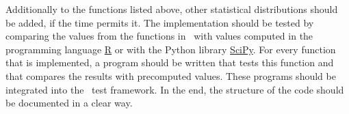 		Additionally to the functions listed above, other statistical distributions should be added, if the time permits it. The implementation should be tested by comparing the values from the functions in \setlx\ with values computed in the programming language \href{https://en.wikipedia.org/wiki/R_(programming_language)}{R} or with the Python library \href{https://www.scipy.org}{SciPy}. For every function that is implemented, a program should be written that tests this function and that compares the results with precomputed values.  These programs should be integrated into the \setlx\ test framework. In the end, the structure of the code should be documented in a clear way.
